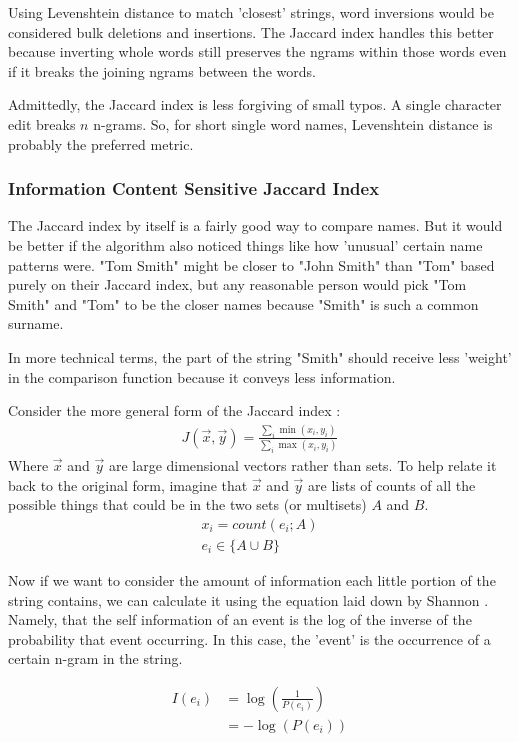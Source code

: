 \documentclass[11pt]{article}
\begin{document}
Using Levenshtein distance to match 'closest' strings, word 
inversions would be considered bulk deletions and insertions. 
The Jaccard index handles this better because inverting whole words 
still preserves the ngrams within those words even if it breaks
the joining ngrams between the words.

Admittedly, the Jaccard index is less forgiving of small typos. 
A single character edit breaks $n$ n-grams. So, for short single
word names, Levenshtein distance is probably the preferred metric.

\subsubsection{Information Content Sensitive Jaccard Index}
The Jaccard index by itself is a fairly good way to compare names.
But it would be better if the algorithm also noticed things like
how 'unusual' certain name patterns were. 
"Tom Smith" might be closer to "John Smith" than "Tom" based purely
on their Jaccard index, but any reasonable person would pick
"Tom Smith" and "Tom" to be the closer names because "Smith" is
such a common surname.

In more technical terms, the part of the string "Smith"
should receive less 'weight' in the comparison function because
it conveys less information. 

Consider the more general form of the Jaccard index \cite{general}:
\begin{align*}
J(\vec{x},\vec{y}) = 
\frac{\sum_i \min(x_i, y_i)}{\sum_i \max(x_i, y_i)}
\end{align*}
Where $\vec{x}$ and $\vec{y}$ are large dimensional vectors rather 
than sets. To help relate it back to the original form, 
imagine that $\vec{x}$ and $\vec{y}$ are lists
of counts of all the possible things that could be in the two sets
(or multisets) $A$ and $B$.
\begin{align*}
x_i = count(e_i; A)\\
e_i \in \{A \cup B \}
\end{align*}

Now if we want to consider the amount of information each little
portion of the string contains, we can calculate it
using the equation laid down by Shannon \cite{shannon}.
Namely, that the self information of an event is the log of the
inverse of the probability that event occurring. In this case,
the 'event' is the occurrence of a certain n-gram in the string.

\begin{align*}
I(e_i) &= \log\left(\frac{1}{P(e_i)}\right)\\
&= -\log(P(e_i))
\end{align*}
\end{document}
